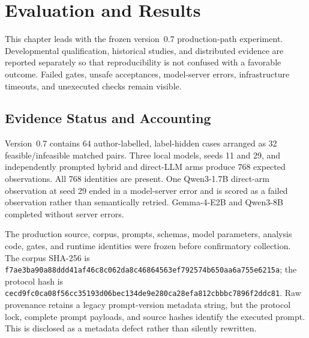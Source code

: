 \chapter{Evaluation and Results}
\label{chap:results}

This chapter leads with the frozen version~0.7 production-path experiment. Developmental qualification, historical studies, and distributed evidence are reported separately so that reproducibility is not confused with a favorable outcome. Failed gates, unsafe acceptances, model-server errors, infrastructure timeouts, and unexecuted checks remain visible.

\section{Evidence Status and Accounting}

Version~0.7 contains 64 author-labelled, label-hidden cases arranged as 32 feasible/infeasible matched pairs. Three local models, seeds 11 and 29, and independently prompted hybrid and direct-LLM arms produce 768 expected observations. All 768 identities are present. One Qwen3-1.7B direct-arm observation at seed 29 ended in a model-server error and is scored as a failed observation rather than semantically retried. Gemma-4-E2B and Qwen3-8B completed without server errors.

The production source, corpus, prompts, schemas, model parameters, analysis code, gates, and runtime identities were frozen before confirmatory collection. The corpus SHA-256 is \texttt{f7ae3ba90a88ddd4\allowbreak 1af46c8c062da8c4\allowbreak 6864563ef792574b\allowbreak 650aa6a755e6215a}; the protocol hash is \texttt{cecd9fc0ca08f56c\allowbreak c35193d06bec134d\allowbreak e9e280ca28efa812\allowbreak cbbbc7896f2ddc81}. Raw provenance retains a legacy prompt-version metadata string, but the protocol lock, complete prompt payloads, and source hashes identify the executed prompt. This is disclosed as a metadata defect rather than silently rewritten.

